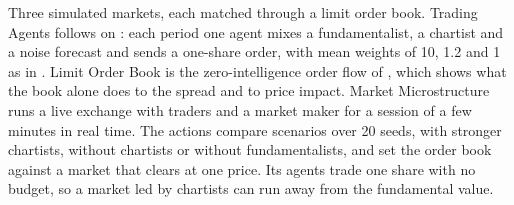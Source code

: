 Three simulated markets, each matched through a limit order book. Trading Agents follows  on : each period one agent mixes a fundamentalist, a chartist and a noise forecast and sends a one-share order, with mean weights of 10, 1.2 and 1 as in . Limit Order Book is the zero-intelligence order flow of , which shows what the book alone does to the spread and to price impact. Market Microstructure runs a live  exchange with  traders and a market maker for a session of a few minutes in real time. The actions compare scenarios over 20 seeds, with stronger chartists, without chartists or without fundamentalists, and set the order book against a market that clears at one price. Its agents trade one share with no budget, so a market led by chartists can run away from the fundamental value.

